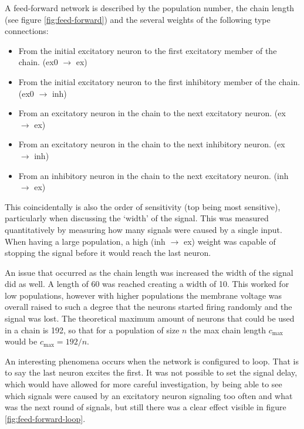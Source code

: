 \documentclass[a4paper,twocolumn]{article}
\begin{document}
A feed-forward network is described by the population number, the chain length
(see figure \ref{fig:feed-forward}) and the several weights of the following
type connections:
\begin{itemize}
    \item From the initial excitatory neuron to the first excitatory member of the
        chain. (ex0 $\rightarrow$ ex)
    \item From the initial excitatory neuron to the first inhibitory member of the
        chain. (ex0 $\rightarrow$ inh)
    \item From an excitatory neuron in the chain to the next excitatory neuron.
        (ex $\rightarrow$ ex)
    \item From an excitatory neuron in the chain to the next inhibitory neuron.
        (ex $\rightarrow$ inh)
    \item From an inhibitory neuron in the chain to the next excitatory neuron.
        (inh $\rightarrow$ ex)
\end{itemize}
This coincidentally is also the order of sensitivity (top being most sensitive),
particularly when discussing the `width' of the signal. This was measured
quantitatively by measuring how many signals were caused by a single input. When
having a large population, a high (inh $\rightarrow$ ex) weight was capable of
stopping the signal before it would reach the last neuron.

An issue that occurred as the chain length was increased the width of the signal
did as well. A length of 60 was reached creating a width of 10. This worked for
low populations, however with higher populations the membrane voltage was
overall raised to such a degree that the neurons started firing randomly and the
signal was lost. The theoretical maximum amount of neurons that could be used in
a chain is 192, so that for a population of size $n$ the max chain length
$c_\text{max}$ would be $c_\text{max} = 192 / n$.

An interesting phenomena occurs when the network is configured to loop. That is
to say the last neuron excites the first. It was not possible to set the
signal delay, which would have allowed for more careful investigation, by being
able to see which signals were caused by an excitatory neuron signaling too
often and what was the next round of signals, but still there was a clear effect
visible in figure \ref{fig:feed-forward-loop}.
\end{document}
